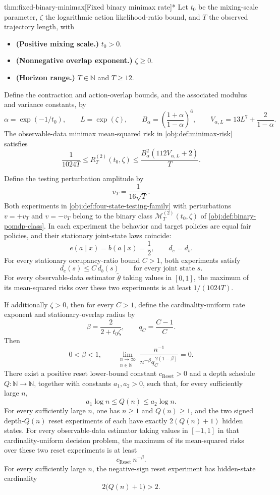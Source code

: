 \documentclass[11pt]{article}
\begin{document}
\begin{theoremv}{thm:fixed-binary-minimax}[Fixed binary minimax rate]*
Let \(t_0\) be the mixing-scale parameter, \(\zeta\) the logarithmic action likelihood-ratio bound, and \(T\) the observed trajectory length, with
\begin{itemize}
\item \textbf{(Positive mixing scale.)} \(t_0>0\).
\item \textbf{(Nonnegative overlap exponent.)} \(\zeta\geq0\).
\item \textbf{(Horizon range.)} \(T\in\mathbb N\) and \(T\geq12\).
\end{itemize}
Define the contraction and action-overlap bounds, and the associated modulus and variance constants, by
\[
\alpha=\exp(-1/t_0),\qquad L=\exp(\zeta),\qquad
B_\alpha=\left(\frac{1+\alpha}{1-\alpha}\right)^6,\qquad
V_{\alpha,L}=13L^7+\frac{2}{1-\alpha}.
\]
The observable-data minimax mean-squared risk in \cref{obj:def:minimax-risk} satisfies
\[
\frac{1}{1024T}
\leq R_T^{(2)}(t_0,\zeta)
\leq \frac{B_\alpha^2(112V_{\alpha,L}+2)}{T}.
\]

Define the testing perturbation amplitude by
\[
v_T=\frac{1}{16\sqrt T}.
\]
Both experiments in \cref{obj:def:four-state-testing-family} with perturbations \(v=+v_T\) and \(v=-v_T\) belong to the binary class \(\mathcal M_T^{(2)}(t_0,\zeta)\) of \cref{obj:def:binary-pomdp-class}. In each experiment the behavior and target policies are equal fair policies, and their stationary joint-state laws coincide:
\[
e(a\mid x)=b(a\mid x)=\frac12,\qquad d_e=d_b.
\]
For every stationary occupancy-ratio bound \(C>1\), both experiments satisfy
\[
d_e(s)\leq C\,d_b(s)
\qquad\text{for every joint state }s.
\]
For every observable-data estimator \(\widetilde\theta\) taking values in \([0,1]\), the maximum of its mean-squared risks over these two experiments is at least \(1/(1024T)\).

If additionally \(\zeta>0\), then for every \(C>1\), define the cardinality-uniform rate exponent and stationary-overlap radius by
\[
\beta=\frac{2}{2+t_0\zeta},\qquad q_C=\frac{C-1}{C}.
\]
Then
\[
0<\beta<1,\qquad
\lim_{\substack{n\to\infty\\ n\in\mathbb N}}
\frac{n^{-1}}{n^{-\beta}q_C^{\,2(1-\beta)}}=0.
\]
There exist a positive reset lower-bound constant \(c_{\mathrm{Reset}}>0\) and a depth schedule \(Q:\mathbb N\to\mathbb N\), together with constants \(a_1,a_2>0\), such that, for every sufficiently large \(n\),
\[
a_1\log n\leq Q(n)\leq a_2\log n.
\]
For every sufficiently large \(n\), one has \(n\geq1\) and \(Q(n)\geq1\), and the two signed depth-\(Q(n)\) reset experiments of \citet{CausalSmithLatentOverlap2026} each have exactly \(2(Q(n)+1)\) hidden states. For every observable-data estimator taking values in \([-1,1]\) in that cardinality-uniform decision problem, the maximum of its mean-squared risks over these two reset experiments is at least
\[
c_{\mathrm{Reset}}\,n^{-\beta}.
\]
For every sufficiently large \(n\), the negative-sign reset experiment has hidden-state cardinality
\[
2\bigl(Q(n)+1\bigr)>2.
\]
\end{theoremv}
\end{document}
